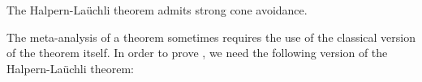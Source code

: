 \begin{theorem}\label{thm:hl-strong-cone-avoidance}
The Halpern-La\"{u}chli theorem admits strong cone avoidance.
\end{theorem}

%
%
%
%
%
%

The meta-analysis of a theorem sometimes requires the use of the classical version of the theorem itself. In order to prove , we need the following version of the Halpern-La\"{u}chli theorem:

